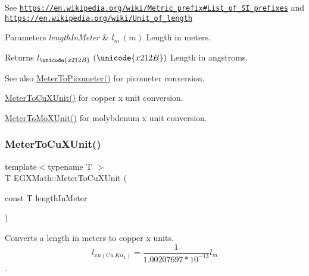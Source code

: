 See \href{https://en.wikipedia.org/wiki/Metric_prefix#List_of_SI_prefixes}{\tt https\+://en.\+wikipedia.\+org/wiki/\+Metric\+\_\+prefix\#\+List\+\_\+of\+\_\+\+S\+I\+\_\+prefixes} and \href{https://en.wikipedia.org/wiki/Unit_of_length}{\tt https\+://en.\+wikipedia.\+org/wiki/\+Unit\+\_\+of\+\_\+length} 
\begin{DoxyParams}{Parameters}
{\em length\+In\+Meter} & $ l_{m}\ (m)$ Length in meters. \\
\hline
\end{DoxyParams}
\begin{DoxyReturn}{Returns}
$ l_{\unicode{x212B}}\ (\unicode{x212B})$ Length in angstroms. 
\end{DoxyReturn}
\begin{DoxySeeAlso}{See also}
\mbox{\hyperlink{group___e_g_x_math-_conversions-_length_conversions-_meter-_s_i_ga5e136454c20254062d6e8637cfbfb8ee}{Meter\+To\+Picometer()}} for picometer conversion. 

\mbox{\hyperlink{group___e_g_x_math-_conversions-_length_conversions-_meter-_non-_s_i_ga67cec26b74704753fc51a8f4db27a4b4}{Meter\+To\+Cu\+X\+Unit()}} for copper x unit conversion. 

\mbox{\hyperlink{group___e_g_x_math-_conversions-_length_conversions-_meter-_non-_s_i_gae0351200a3d90c4efe741c6057b2fd4b}{Meter\+To\+Mo\+X\+Unit()}} for molybdenum x unit conversion. 
\end{DoxySeeAlso}
\mbox{\label{group___e_g_x_math-_conversions-_length_conversions-_meter-_non-_s_i_ga67cec26b74704753fc51a8f4db27a4b4}} 
\subsubsection{\texorpdfstring{Meter\+To\+Cu\+X\+Unit()}{MeterToCuXUnit()}}
{\footnotesize\ttfamily template$<$typename T $>$ \\
T E\+G\+X\+Math\+::\+Meter\+To\+Cu\+X\+Unit (\begin{DoxyParamCaption}\item[{const T}]{length\+In\+Meter }\end{DoxyParamCaption})}



Converts a length in meters to copper x units. \[ l_{xu(Cu\ K\alpha_1)}= \frac{1}{1.00207697*10^{-13}} l_{m} \]. 


